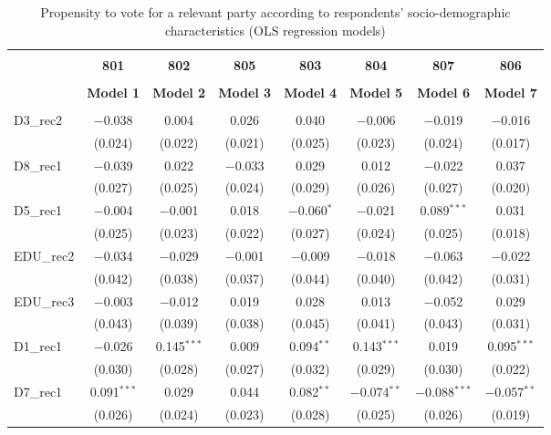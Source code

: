 \documentclass[
]{article}
\begin{document}
\begin{table}[!htbp] \centering 
  \caption{Propensity to vote for a relevant party according to respondents' 
                     socio-demographic characteristics (OLS regression models)} 
  \label{table:full_ols_de} 
\begin{tabular}{@{\extracolsep{5pt}}lccccccc} 
\\[-1.8ex]\hline \\[-1.8ex] 
 & \textbf{801} & \textbf{802} & \textbf{805} & \textbf{803} & \textbf{804} & \textbf{807} & \textbf{806} \\ 
\\[-1.8ex] & \textbf{Model 1} & \textbf{Model 2} & \textbf{Model 3} & \textbf{Model 4} & \textbf{Model 5} & \textbf{Model 6} & \textbf{Model 7}\\ 
\hline \\[-1.8ex] 
 D3\_rec2 & $-$0.038 & 0.004 & 0.026 & 0.040 & $-$0.006 & $-$0.019 & $-$0.016 \\ 
  & (0.024) & (0.022) & (0.021) & (0.025) & (0.023) & (0.024) & (0.017) \\ 
  D8\_rec1 & $-$0.039 & 0.022 & $-$0.033 & 0.029 & 0.012 & $-$0.022 & 0.037 \\ 
  & (0.027) & (0.025) & (0.024) & (0.029) & (0.026) & (0.027) & (0.020) \\ 
  D5\_rec1 & $-$0.004 & $-$0.001 & 0.018 & $-$0.060$^{*}$ & $-$0.021 & 0.089$^{***}$ & 0.031 \\ 
  & (0.025) & (0.023) & (0.022) & (0.027) & (0.024) & (0.025) & (0.018) \\ 
  EDU\_rec2 & $-$0.034 & $-$0.029 & $-$0.001 & $-$0.009 & $-$0.018 & $-$0.063 & $-$0.022 \\ 
  & (0.042) & (0.038) & (0.037) & (0.044) & (0.040) & (0.042) & (0.031) \\ 
  EDU\_rec3 & $-$0.003 & $-$0.012 & 0.019 & 0.028 & 0.013 & $-$0.052 & 0.029 \\ 
  & (0.043) & (0.039) & (0.038) & (0.045) & (0.041) & (0.043) & (0.031) \\ 
  D1\_rec1 & $-$0.026 & 0.145$^{***}$ & 0.009 & 0.094$^{**}$ & 0.143$^{***}$ & 0.019 & 0.095$^{***}$ \\ 
  & (0.030) & (0.028) & (0.027) & (0.032) & (0.029) & (0.030) & (0.022) \\ 
  D7\_rec1 & 0.091$^{***}$ & 0.029 & 0.044 & 0.082$^{**}$ & $-$0.074$^{**}$ & $-$0.088$^{***}$ & $-$0.057$^{**}$ \\ 
  & (0.026) & (0.024) & (0.023) & (0.028) & (0.025) & (0.026) & (0.019) \\ 

\end{tabular}
\end{table}
\end{document}
